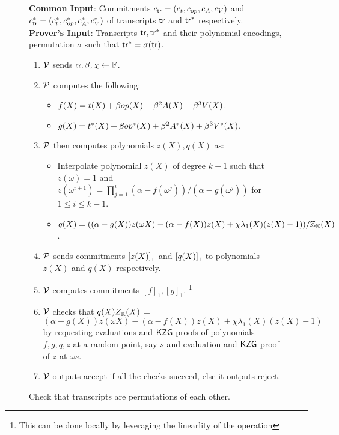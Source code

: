 \begin{figure}[htbp]

    \begin{mdframed}
    {
            {\bf Common Input}: Commitments $c_{\mathsf{tr}}=(c_t,c_{op},c_A, c_V)$ and $c_{\mathsf{tr}}^\ast=(c_t^\ast,c_{op}^\ast, c_A^\ast, c_V^\ast)$
        of transcripts $\mathsf{tr}$ and $\mathsf{tr}^\ast$ respectively.\\
    {\bf Prover's Input}: Transcripts $\mathsf{tr}, \mathsf{tr}^{*}$ and their polynomial encodings, permutation $\sigma$ such that $\mathsf{tr}^{*}=\sigma(\mathsf{tr})$.
        \begin{enumerate}[leftmargin=1em, label=\arabic*]
            \item $\mathcal{V}$ sends $\alpha,\beta, \chi\gets \mathbb{F}$.
            \item $\mathcal{P}$ computes the following: 
            \begin{itemize}[label=-]
            	\item $f(X)=t(X) + \beta {op}(X) + \beta^2 A(X) + \beta^3 V(X)$.
            	\item $g(X) = t^\ast(X) + \beta {op}^\ast(X)+ \beta^2 A^\ast(X) + \beta^3 V^\ast(X)$.
            \end{itemize}
			\item $\mathcal{P}$ then computes polynomials $z(X),q(X)$ as:
            \begin{itemize}[leftmargin=1em, label=-]
                \item Interpolate polynomial $z(X)$ of degree $k-1$ such that $z(\omega)=1$ and
                $z(\omega^{i+1})=\prod_{j=1}^i (\alpha - f(\omega^j))/(\alpha - g(\omega^j))$ for $1\leq i\leq k-1$.
                \item $q(X) = ((\alpha - g(X))z(\omega X) - (\alpha - f(X))z(X) + \chi\lambda_1(X)(z(X) - 1))/\mathbb{Z}_{\mathbb{K}}(X)$.
            \end{itemize}
            \item $\mathcal{P}$ sends commitments $\left[{z(X)}\right]_1$ and $\left[{q(X)}\right]_1$ to polynomials $z(X)$ and $q(X)$ respectively.
            \item $\mathcal{V}$ computes commitments $[f]_1, [g]_1$. \footnote{This can be done locally by leveraging the linearlity of the operation}
            \item $\mathcal{V}$ checks that $q(X)Z_{\mathbb{K}}(X)$ = $(\alpha - g(X))z(\omega X)-(\alpha - f(X))z(X) + \chi\lambda_1(X)(z(X) - 1)$
            by requesting evaluations and $\mathsf{KZG}$ proofs of polynomials $f,g, q, z$ at a random point, say $s$ and evaluation and $\mathsf{KZG}$ proof of $z$ at $\omega s$.
            \item $\mathcal{V}$ outputs accept if all the checks succeed, else it outputs reject.
        \end{enumerate}
    }
    \end{mdframed}
    \caption{Check that transcripts are permutations of each other.}
    \label{fig:permutated-transcripts}
\end{figure}

